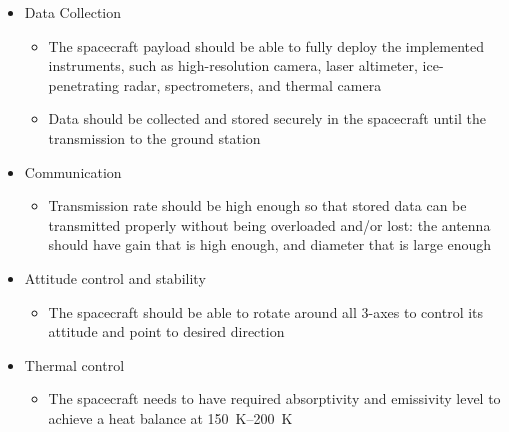 \begin{itemize}
\item{Data Collection}
  \begin{itemize}
  \item{The spacecraft payload should be able to fully deploy the
    implemented instruments, such as high-resolution camera, laser
    altimeter, ice-penetrating radar, spectrometers, and thermal
    camera}
  \item{Data should be collected and stored securely in the spacecraft
    until the transmission to the ground station}
  \end{itemize}

\item{Communication}
  \begin{itemize}
  \item{Transmission rate should be high enough so that stored data
    can be transmitted properly without being overloaded and/or lost:
    the antenna should have gain that is high enough, and diameter
    that is large enough}
  \end{itemize}

\item{Attitude control and stability}
  \begin{itemize}
  \item{The spacecraft should be able to rotate around all 3-axes to
    control its attitude and point to desired direction}
  \end{itemize}

\item{Thermal control}
  \begin{itemize}
  \item{The spacecraft needs to have required absorptivity and
    emissivity level to achieve a heat balance at
    \SI{150}{K}--\SI{200}{K}}
  \end{itemize}

\end{itemize}

